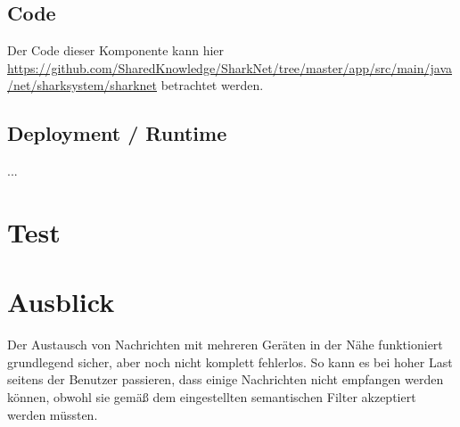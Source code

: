\subsection{Code}
Der Code dieser Komponente kann hier \url{https://github.com/SharedKnowledge/SharkNet/tree/master/app/src/main/java/net/sharksystem/sharknet} betrachtet werden. 

\subsection{Deployment / Runtime}
...


\section{Test}



\section{Ausblick}
Der Austausch von Nachrichten mit mehreren Geräten in der Nähe funktioniert grundlegend sicher, aber noch nicht komplett fehlerlos. So kann es bei hoher Last seitens der Benutzer passieren, dass einige Nachrichten nicht empfangen werden können, obwohl sie gemäß dem eingestellten semantischen Filter akzeptiert werden müssten. 